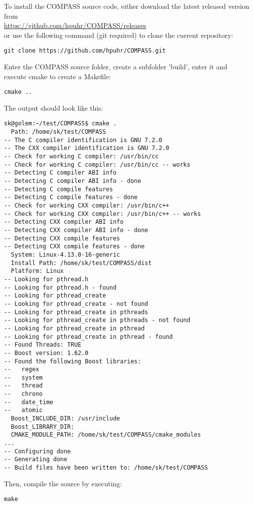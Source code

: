 To install the COMPASS source code, either download the latest released version from \\ \url{https://github.com/hpuhr/COMPASS/releases} \\
or use the following command (git required) to clone the current repository:

\begin{lstlisting}
git clone https://github.com/hpuhr/COMPASS.git
\end{lstlisting}

Enter the COMPASS source folder, create a subfolder 'build', enter it and execute cmake to create a Makefile:

\begin{lstlisting}
cmake ..
\end{lstlisting}

The output should look like this:
\begin{lstlisting}
sk@golem:~/test/COMPASS$ cmake .
  Path: /home/sk/test/COMPASS
-- The C compiler identification is GNU 7.2.0
-- The CXX compiler identification is GNU 7.2.0
-- Check for working C compiler: /usr/bin/cc
-- Check for working C compiler: /usr/bin/cc -- works
-- Detecting C compiler ABI info
-- Detecting C compiler ABI info - done
-- Detecting C compile features
-- Detecting C compile features - done
-- Check for working CXX compiler: /usr/bin/c++
-- Check for working CXX compiler: /usr/bin/c++ -- works
-- Detecting CXX compiler ABI info
-- Detecting CXX compiler ABI info - done
-- Detecting CXX compile features
-- Detecting CXX compile features - done
  System: Linux-4.13.0-16-generic
  Install Path: /home/sk/test/COMPASS/dist
  Platform: Linux
-- Looking for pthread.h
-- Looking for pthread.h - found
-- Looking for pthread_create
-- Looking for pthread_create - not found
-- Looking for pthread_create in pthreads
-- Looking for pthread_create in pthreads - not found
-- Looking for pthread_create in pthread
-- Looking for pthread_create in pthread - found
-- Found Threads: TRUE  
-- Boost version: 1.62.0
-- Found the following Boost libraries:
--   regex
--   system
--   thread
--   chrono
--   date_time
--   atomic
  Boost_INCLUDE_DIR: /usr/include
  Boost_LIBRARY_DIR: 
  CMAKE_MODULE_PATH: /home/sk/test/COMPASS/cmake_modules
...
-- Configuring done
-- Generating done
-- Build files have been written to: /home/sk/test/COMPASS
\end{lstlisting}

Then, compile the source by executing:

\begin{lstlisting}
make
\end{lstlisting}


